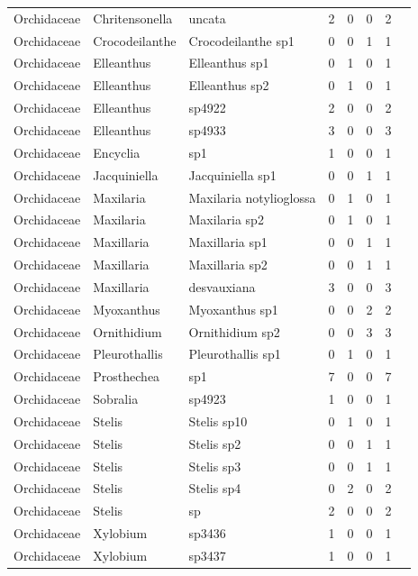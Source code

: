 \documentclass[a4paper,12pt]{article}
\begin{document}
\begin{table}[H]
\begin{tabular}{llllcccc}
        Orchidaceae & Chritensonella  & uncata & 2 & 0 & 0 & 2 \\
        Orchidaceae & Crocodeilanthe & Crocodeilanthe sp1 & 0 & 0 & 1 & 1 \\
        Orchidaceae & Elleanthus & Elleanthus sp1 & 0 & 1 & 0 & 1 \\
        Orchidaceae & Elleanthus & Elleanthus sp2 & 0 & 1 & 0 & 1 \\
        Orchidaceae & Elleanthus & sp4922 & 2 & 0 & 0 & 2 \\
        Orchidaceae & Elleanthus & sp4933 & 3 & 0 & 0 & 3 \\
        Orchidaceae & Encyclia & sp1 & 1 & 0 & 0 & 1 \\
        Orchidaceae & Jacquiniella & Jacquiniella sp1 & 0 & 0 & 1 & 1 \\
        Orchidaceae & Maxilaria & Maxilaria notylioglossa & 0 & 1 & 0 & 1 \\
        Orchidaceae & Maxilaria & Maxilaria sp2 & 0 & 1 & 0 & 1 \\
        Orchidaceae & Maxillaria & Maxillaria sp1 & 0 & 0 & 1 & 1 \\
        Orchidaceae & Maxillaria & Maxillaria sp2 & 0 & 0 & 1 & 1 \\
        Orchidaceae & Maxillaria & desvauxiana & 3 & 0 & 0 & 3 \\
        Orchidaceae & Myoxanthus & Myoxanthus sp1 & 0 & 0 & 2 & 2 \\
        Orchidaceae & Ornithidium & Ornithidium sp2 & 0 & 0 & 3 & 3 \\
        Orchidaceae & Pleurothallis & Pleurothallis sp1 & 0 & 1 & 0 & 1 \\
        Orchidaceae & Prosthechea & sp1 & 7 & 0 & 0 & 7 \\
        Orchidaceae & Sobralia & sp4923 & 1 & 0 & 0 & 1 \\
        Orchidaceae & Stelis & Stelis sp10 & 0 & 1 & 0 & 1 \\
        Orchidaceae & Stelis & Stelis sp2 & 0 & 0 & 1 & 1 \\
        Orchidaceae & Stelis & Stelis sp3 & 0 & 0 & 1 & 1 \\
        Orchidaceae & Stelis & Stelis sp4 & 0 & 2 & 0 & 2 \\
        Orchidaceae & Stelis & sp & 2 & 0 & 0 & 2 \\
        Orchidaceae & Xylobium & sp3436 & 1 & 0 & 0 & 1 \\
        Orchidaceae & Xylobium & sp3437 & 1 & 0 & 0 & 1 \\

\end{tabular}
\end{table}
\end{document}
